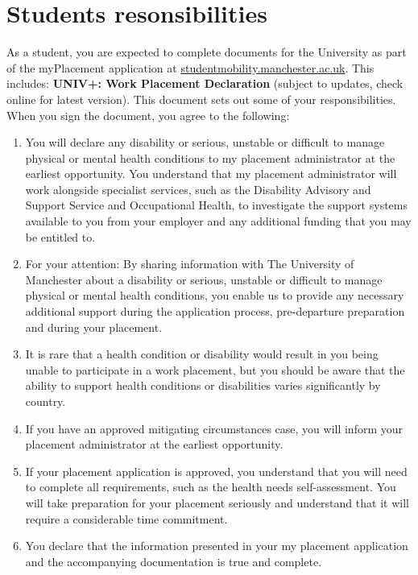 \documentclass[
]{book}
\providecommand{\tightlist}{%
  \setlength{\itemsep}{0pt}\setlength{\parskip}{0pt}}
\begin{document}
\section{Students resonsibilities}\label{students}

As a student, you are expected to complete documents for the University as part of the myPlacement application at \href{https://studentmobility.manchester.ac.uk/}{studentmobility.manchester.ac.uk}. This includes: \textbf{UNIV+: Work Placement Declaration }(subject to updates, check online for latest version). This document sets out some of your responsibilities. When you sign the document, you agree to the following:

\begin{enumerate}
\def\labelenumi{\arabic{enumi}.}
\tightlist
\item
  You will declare any disability or serious, unstable or difficult to manage physical or mental health conditions to my placement administrator at the earliest opportunity. You understand that my placement administrator will work alongside specialist services, such as the Disability Advisory and Support Service and Occupational Health, to investigate the support systems available to you from your employer and any additional funding that you may be entitled to.
\item
  For your attention: By sharing information with The University of Manchester about a disability or serious, unstable or difficult to manage physical or mental health conditions, you enable us to provide any necessary additional support during the application process, pre-departure preparation and during your placement.
\item
  It is rare that a health condition or disability would result in you being unable to participate in a work placement, but you should be aware that the ability to support health conditions or disabilities varies significantly by country.
\item
  If you have an approved mitigating circumstances case, you will inform your placement administrator at the earliest opportunity.
\item
  If your placement application is approved, you understand that you will need to complete all requirements, such as the health needs self-assessment. You will take preparation for your placement seriously and understand that it
  will require a considerable time commitment.
\item
  You declare that the information presented in your my placement application and the accompanying documentation is true and complete.
\end{enumerate}
\end{document}
